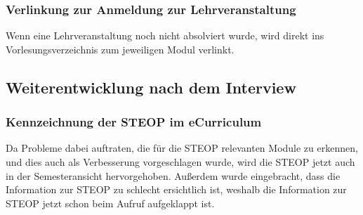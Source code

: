 \documentclass[a4paper,10pt]{scrartcl}
\begin{document}
\subsubsection*{Verlinkung zur Anmeldung zur Lehrveranstaltung}

Wenn eine Lehrveranstaltung noch nicht absolviert wurde, wird direkt ins Vorlesungsverzeichnis zum jeweiligen Modul verlinkt.

\noindent{}
\medskip

\subsection{Weiterentwicklung nach dem Interview}

\subsubsection*{Kennzeichnung der STEOP im eCurriculum}

Da Probleme dabei auftraten, die für die STEOP relevanten Module zu erkennen, und dies auch als Verbesserung vorgeschlagen wurde, wird die STEOP jetzt auch in der
Semesteransicht hervorgehoben. Außerdem wurde eingebracht, dass die Information zur STEOP zu schlecht ersichtlich ist, weshalb die Information zur STEOP jetzt
schon beim Aufruf aufgeklappt ist.

\noindent{}
\medskip
\end{document}
